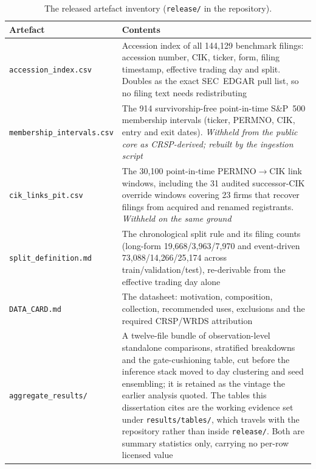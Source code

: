 \begin{table}[htbp]
  \centering
  \caption[The released artefact inventory]{The released artefact inventory (\texttt{release/} in the repository).}
  \label{tab:app-release}
  \small
  \begin{tabular}{lp{9.4cm}}
    \toprule
    Artefact & Contents \\
    \midrule
    \texttt{accession\_index.csv} & Accession index of all 144{,}129 benchmark filings: accession number, CIK, ticker, form, filing timestamp, effective trading day and split. Doubles as the exact SEC~EDGAR pull list, so no filing text needs redistributing \\ %
    \texttt{membership\_intervals.csv} & The 914 survivorship-free point-in-time S\&P~500 membership intervals (ticker, PERMNO, CIK, entry and exit dates). \emph{Withheld from the public core as CRSP-derived; rebuilt by the ingestion script} \\ %
    \texttt{cik\_links\_pit.csv} & The 30{,}100 point-in-time PERMNO$\to$CIK link windows, including the 31 audited successor-CIK override windows covering 23 firms that recover filings from acquired and renamed registrants. \emph{Withheld on the same ground} \\ %
    \texttt{split\_definition.md} & The chronological split rule and its filing counts (long-form 19{,}668/3{,}963/7{,}970 and event-driven 73{,}088/14{,}266/25{,}174 across train/validation/test), re-derivable from the effective trading day alone \\ %
    \texttt{DATA\_CARD.md} & The datasheet: motivation, composition, collection, recommended uses, exclusions and the required CRSP/WRDS attribution \\ %
    \texttt{aggregate\_results/} & A twelve-file bundle of observation-level standalone comparisons, stratified breakdowns and the gate-cushioning table, cut before the inference stack moved to day clustering and seed ensembling; it is retained as the vintage the earlier analysis quoted. The tables this dissertation cites are the working evidence set under \texttt{results/tables/}, which travels with the repository rather than inside \texttt{release/}. Both are summary statistics only, carrying no per-row licensed value \\ %

\end{tabular}
\end{table}
